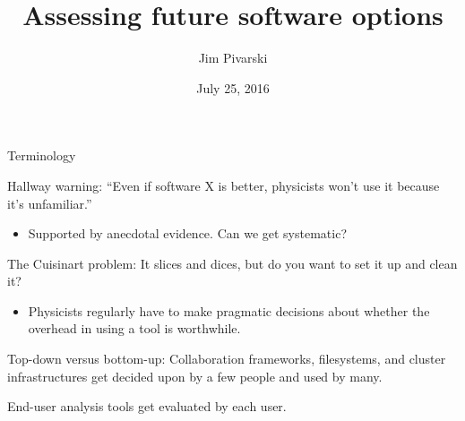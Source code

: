 \documentclass{beamer}
\title[2016-07-25-future-software-psych]{Assessing future software options}
\author{Jim Pivarski}
\institute{Princeton -- DIANA}
\date{July 25, 2016}
\begin{document}

\begin{frame}
  \titlepage
\end{frame}



\begin{frame}{Terminology}
\vspace{0.25 cm}

\begin{block}{Hallway warning:}
``Even if software X is better, physicists won't use it because it's unfamiliar.''
\begin{itemize}
\item Supported by anecdotal evidence. Can we get systematic?
\end{itemize}
\end{block}

\begin{block}{The Cuisinart problem:}
It slices and dices, but do you want to set it up and clean it?
\begin{itemize}
\item Physicists regularly have to make pragmatic decisions about whether the overhead in using a tool is worthwhile.
\end{itemize}
\end{block}

\begin{block}{Top-down versus bottom-up:}
Collaboration frameworks, filesystems, and cluster infrastructures get decided upon by a few people and used by many.

\vspace{0.25 cm}
End-user analysis tools get evaluated by each user.
\end{block}
\end{frame}
\end{document}
